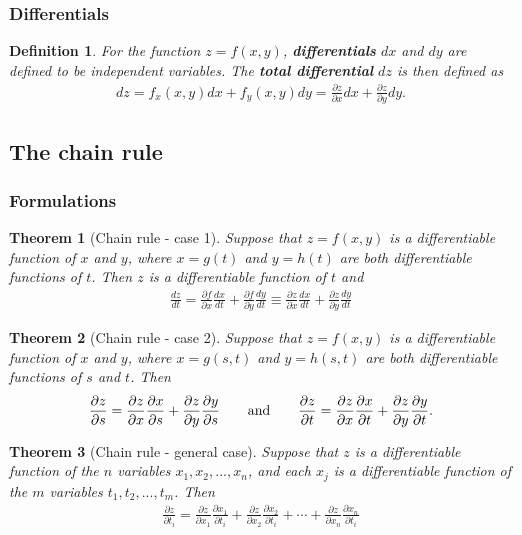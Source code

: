 \documentclass{article}
\theoremstyle{sltheorem}
\newtheorem{definition}{Definition}[section]
\newtheorem{theorem}{Theorem}[section]
\newcommand{\p}{\partial}
\newcommand{\hs}{\hspace{0.7cm}}
\newcommand*\B[1]{\textbf{#1}}
\begin{document}
\subsubsection{Differentials}
\begin{definition}
    For the function $z=f(x,y)$, \B{differentials} $dx$ and $dy$ are
    defined to be independent variables. The \B{total differential} $dz$
    is then defined as
    \begin{align*}
        dz = f_x(x,y)dx + f_y(x,y)dy 
        = \frac{\p z}{\p x}dx + \frac{\p z}{\p y}dy.
    \end{align*}
\end{definition}
\subsection{The chain rule}
\subsubsection{Formulations}
\begin{theorem}[Chain rule - case 1]
    Suppose that $z=f(x,y)$ is a differentiable function of $x$ and $y$,
    where $x=g(t)$ and $y=h(t)$ are both differentiable functions of $t$.
    Then $z$ is a differentiable function of $t$ and
    \begin{align*}
        \frac{dz}{dt}=
        \frac{\p f}{\p x}\frac{dx}{dt}+\frac{\p f}{\p y}\frac{dy}{dt}
        \equiv \frac{\p z}{\p x}\frac{dx}{dt}+\frac{\p z}{\p y}\frac{dy}{dt}
    \end{align*}
\end{theorem}
\begin{theorem}[Chain rule - case 2]
    Suppose that $z=f(x,y)$ is a differentiable function of $x$ and $y$,
    where $x=g(s,t)$ and $y=h(s,t)$ are both differentiable functions of
    $s$ and $t$. Then
    \begin{align*}
        \frac{\p z}{\p s}=\frac{\p z}{\p x}\frac{\p x}{\p s}
        + \frac{\p z}{\p y}\frac{\p y}{\p s}
        \text{\hs and\hs}
        \frac{\p z}{\p t}=\frac{\p z}{\p x}\frac{\p x}{\p t}
        + \frac{\p z}{\p y}\frac{\p y}{\p t}.
    \end{align*} 
\end{theorem}
\begin{theorem}[Chain rule - general case]
    Suppose that $z$ is a differentiable function of the $n$ variables
    $x_1, x_2, ..., x_n$, and each $x_j$ is a differentiable function of
    the $m$ variables $t_1,t_2, ...,t_m$. Then
    \begin{align*}
        \frac{\p z}{\p t_i}=
        \frac{\p z}{\p x_1}\frac{\p x_1}{\p t_i}
        + \frac{\p z}{\p x_2}\frac{\p x_2}{\p t_i}
        + \cdots
        + \frac{\p z}{\p x_n}\frac{\p x_n}{\p t_i}
    \end{align*} 
\end{theorem}
\end{document}
